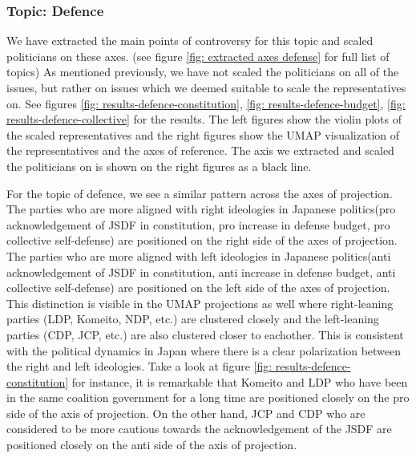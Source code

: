 \documentclass[final,5p,times,twocolumn,authoryear]{elsarticle}
\begin{document}
\subsubsection{Topic: Defence}
We have extracted the main points of controversy for this topic and scaled politicians on these axes. (see figure \ref{fig: extracted axes defense} for full list of topics) As mentioned previously, we have not scaled the politicians on all of the issues, but rather on issues which we deemed suitable to scale the representatives on. See figures \ref{fig: results-defence-constitution}, \ref{fig: results-defence-budget}, \ref{fig: results-defence-collective} for the results. The left figures show the violin plots of the scaled representatives and the right figures show the UMAP visualization of the representatives and the axes of reference. The axis we extracted and scaled the politicians on is shown on the right figures as a black line. 

For the topic of defence, we see a similar pattern across the axes of projection. The parties who are more aligned with right ideologies in Japanese politics(pro acknowledgement of JSDF in constitution, pro increase in defense budget, pro collective self-defense) are positioned on the right side of the axes of projection. The parties who are more aligned with left ideologies in Japanese politics(anti acknowledgement of JSDF in constitution, anti increase in defense budget, anti collective self-defense) are positioned on the left side of the axes of projection. This distinction is visible in the UMAP projections as well where right-leaning parties (LDP, Komeito, NDP, etc.) are clustered closely and the left-leaning parties (CDP, JCP, etc.) are also clustered closer to eachother. This is consistent with the political dynamics in Japan where there is a clear polarization between the right and left ideologies. Take a look at figure \ref{fig: results-defence-constitution} for instance, it is remarkable that Komeito and LDP who have been in the same coalition government for a long time are positioned closely on the pro side of the axis of projection. On the other hand, JCP and CDP who are considered to be more cautious towards the acknowledgement of the JSDF are positioned closely on the anti side of the axis of projection.
\end{document}
